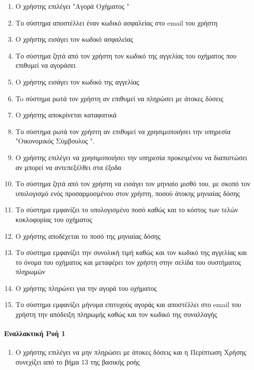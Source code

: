 \documentclass{../ol-softwaremanual}
\begin{document}
	\begin{enumerate}
		\item Ο χρήστης επιλέγει \en"\gr Αγορά Οχήματος \en"\gr
		\item Το σύστημα αποστέλλει έναν κωδικό ασφαλείας στο \en email \gr του χρήστη
		\item Ο χρήστης εισάγει τον κωδικό ασφαλείας		
		\item Το σύστημα ζητά από τον χρήστη τον κωδικό της αγγελίας του οχήματος που επιθυμεί να αγοράσει
		\item Ο χρήστης εισάγει τον κωδικό της αγγελίας	
		\item To σύστημα ρωτά τον χρήστη αν επιθυμεί να πληρώσει με άτοκες δόσεις
		\item Ο χρήστης αποκρίνεται καταφατικά			
		\item Το σύστημα ρωτά τον χρήστη αν επιθυμεί να χρησιμοποιήσει την υπηρεσία \en"\gr Οικονομικός Σύμβουλος \en"\gr.
		\item Ο χρήστης επιλέγει να χρησιμοποιήσει την υπηρεσία προκειμένου να διαπιστώσει αν μπορεί να αντεπεξέλθει στα έξοδα 
		\item Το σύστημα ζητά από τον χρήστη να εισάγει τον μηνιαίο μισθό του, με σκοπό τον υπολογισμό ενός προσαρμοσμένου στον χρήστη, ποσού άτοκης μηνιαίας δόσης
		\item Το σύστημα εμφανίζει το υπολογισμένο ποσό καθώς και το κόστος των τελών κυκλοφορίας του οχήματος
		\item Ο χρήστης αποδέχεται το ποσό της μηνιαίας δόσης
		\item Το σύστημα εμφανίζει την συνολική τιμή καθώς και τον κωδικό της αγγελίας και το όνομα του οχήματος και μεταφέρει τον χρήστη στην σελίδα του συστήματος πληρωμών
		\item Ο χρήστης πληρώνει για την αγορά του οχήματος
		\item Το σύστημα εμφανίζει μήνυμα επιτυχούς αγοράς και αποστέλλει στο \en email \gr του χρήστη την απόδειξη πληρωμής καθώς και τον κωδικό της συναλλαγής
	\end{enumerate}

	\paragraph{Εναλλακτική Ροή 1}
	\begin{enumerate}
		\item Ο χρήστης επιλέγει να μην πληρώσει με άτοκες δόσεις και η Περίπτωση Χρήσης συνεχίζει από το βήμα 13 της βασικής ροής
	\end{enumerate}
\end{document}
